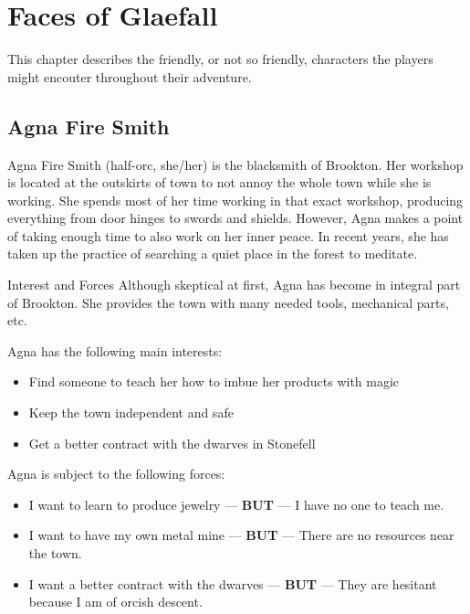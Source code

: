 \chapter{Faces of Glaefall}

This chapter describes the friendly, or not so friendly, characters the players might encouter throughout their adventure.

\begin{multicols}{2}

\section{Agna Fire Smith}

Agna Fire Smith (half-orc, she/her) is the blacksmith of Brookton.
Her workshop is located at the outskirts of town to not annoy the whole town while she is working.
She spends most of her time working in that exact workshop, producing everything from door hinges to swords and shields.
However, Agna makes a point of taking enough time to also work on her inner peace.
In recent years, she has taken up the practice of searching a quiet place in the forest to meditate.

\begin{DndSidebar}{Interest and Forces}
    Although skeptical at first, Agna has become in integral part of Brookton.
    She provides the town with many needed tools, mechanical parts, etc.
    
    Agna has the following main interests:
    \begin{itemize}
        \item{Find someone to teach her how to imbue her products with magic}
        \item{Keep the town independent and safe}
        \item{Get a better contract with the dwarves in Stonefell}
    \end{itemize}
    
    Agna is subject to the following forces:
    \begin{itemize}
        \item{I want to learn to produce jewelry --- \textbf{BUT} --- I have no one to teach me.}
        \item{I want to have my own metal mine --- \textbf{BUT} --- There are no resources near the town.}
        \item{I want a better contract with the dwarves --- \textbf{BUT} --- They are hesitant because I am of orcish descent.}
    \end{itemize}
\end{DndSidebar}


\end{multicols}
